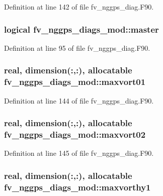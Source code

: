 Definition at line 142 of file fv\-\_\-nggps\-\_\-diag.\-F90.

\subsubsection[{master}]{\setlength{\rightskip}{0pt plus 5cm}logical fv\-\_\-nggps\-\_\-diags\-\_\-mod\-::master\hspace{0.3cm}{\ttfamily [private]}}\label{classfv__nggps__diags__mod_a1cd9085200009db10173487afdf6107c}


Definition at line 95 of file fv\-\_\-nggps\-\_\-diag.\-F90.

\subsubsection[{maxvort01}]{\setlength{\rightskip}{0pt plus 5cm}real, dimension(\-:,\-:), allocatable fv\-\_\-nggps\-\_\-diags\-\_\-mod\-::maxvort01\hspace{0.3cm}{\ttfamily [private]}}\label{classfv__nggps__diags__mod_ab16739d4afbb45dc85d35490ace8b500}


Definition at line 144 of file fv\-\_\-nggps\-\_\-diag.\-F90.

\subsubsection[{maxvort02}]{\setlength{\rightskip}{0pt plus 5cm}real, dimension(\-:,\-:), allocatable fv\-\_\-nggps\-\_\-diags\-\_\-mod\-::maxvort02\hspace{0.3cm}{\ttfamily [private]}}\label{classfv__nggps__diags__mod_ae3d6e23a909d7ca356786721cebc4c66}


Definition at line 145 of file fv\-\_\-nggps\-\_\-diag.\-F90.

\subsubsection[{maxvorthy1}]{\setlength{\rightskip}{0pt plus 5cm}real, dimension(\-:,\-:), allocatable fv\-\_\-nggps\-\_\-diags\-\_\-mod\-::maxvorthy1\hspace{0.3cm}{\ttfamily [private]}}\label{classfv__nggps__diags__mod_a8ebec458193f8834ccfe45e2d770e9d7}


